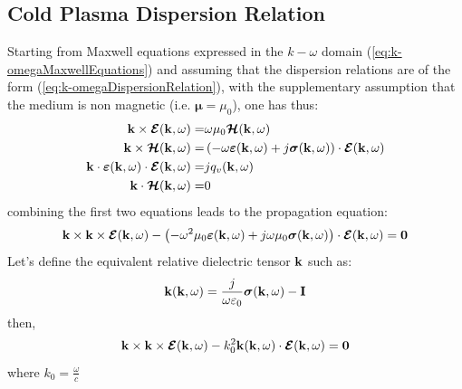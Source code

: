 \subsection{Cold Plasma Dispersion Relation}
Starting from Maxwell equations expressed in the $k-\omega$ domain (\ref{eq:k-omegaMaxwellEquations}) and assuming that the dispersion relations are of the form (\ref{eq:k-omegaDispersionRelation}), with the supplementary assumption that the medium is non magnetic (i.e. $\boldsymbol{\mu}=\mu_0$), one has thus:
\begin{subequations}
	\begin{align}
		{\mathbf k} \times \boldsymbol{\mathcal{E}} ({\mathbf k}, \omega) 
		=& 
		\omega \mu_0 \boldsymbol{\mathcal{H}}({\mathbf k}, \omega) 
		\\
		{\mathbf k} \times \boldsymbol{\mathcal{H}} ({\mathbf k}, \omega) 
		=& 
		\left(
		-\omega \boldsymbol{\varepsilon} ({\mathbf k}, \omega) 
		+ 	
		j\boldsymbol{\sigma} ({\mathbf k}, \omega) 
		\right) \cdot 
		\boldsymbol{\mathcal{E}}({\mathbf k}, \omega)
		\\
		{\mathbf k}  \cdot \boldsymbol{\varepsilon}({\mathbf k}, \omega)  \cdot \boldsymbol{\mathcal{E}} ({\mathbf k}, \omega) 
		=& jq_v({\mathbf k}, \omega) 
		\\
		{\mathbf k}  \cdot \boldsymbol{\mathcal{H}} ({\mathbf k}, \omega) 
		=& 0	
	\end{align}
\end{subequations}
combining the first two equations leads to the propagation equation:
\begin{equation}
{\mathbf k} \times {\mathbf k} \times \boldsymbol{\mathcal{E}} ({\mathbf k}, \omega) 
-
\left(
-\omega^2 \mu_0 \boldsymbol{\varepsilon} ({\mathbf k}, \omega) 
+ 	
j\omega\mu_0\boldsymbol{\sigma} ({\mathbf k}, \omega) 
\right) \cdot 
\boldsymbol{\mathcal{E}}({\mathbf k}, \omega)
=
\boldsymbol{0}
\end{equation}
Let's define the equivalent relative dielectric tensor ${\mathbf k}$ such as:
\begin{equation}
{\mathbf k}({\mathbf k},\omega)
=
\frac{j}{\omega\varepsilon_0}\boldsymbol{\sigma} ({\mathbf k}, \omega)
-\mathbf{I}
\end{equation}
then,
\begin{equation}
{\mathbf k} \times {\mathbf k} \times \boldsymbol{\mathcal{E}} ({\mathbf k}, \omega) 
- k_0^2
{\mathbf k}({\mathbf k}, \omega) \cdot 
\boldsymbol{\mathcal{E}}({\mathbf k}, \omega)
=
\boldsymbol{0}
\end{equation}
where $k_0=\frac{\omega}{c}$
